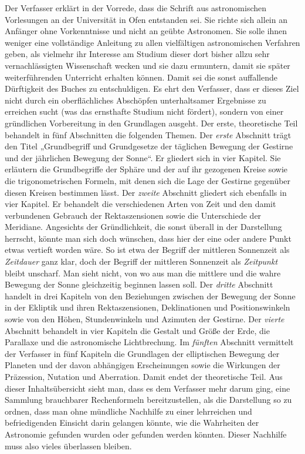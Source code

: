 Der Verfasser erklärt in der Vorrede, dass die Schrift aus astronomischen Vorlesungen an der Universität in Ofen entstanden sei. Sie richte sich allein an Anfänger ohne Vorkenntnisse und nicht an geübte Astronomen. Sie solle ihnen weniger eine vollständige Anleitung zu allen vielfältigen astronomischen Verfahren geben, als vielmehr ihr Interesse am Studium dieser dort bisher allzu sehr vernachlässigten Wissenschaft wecken und sie dazu ermuntern, damit sie später weiterführenden Unterricht erhalten können. Damit sei die sonst auffallende Dürftigkeit des Buches zu entschuldigen. Es ehrt den Verfasser, dass er dieses Ziel nicht durch ein oberflächliches Abschöpfen unterhaltsamer Ergebnisse zu erreichen sucht (was das ernsthafte Studium nicht fördert), sondern von einer gründlichen Vorbereitung in den Grundlagen ausgeht. Der erste, theoretische Teil behandelt in fünf Abschnitten die folgenden Themen. Der \emph{erste} Abschnitt trägt den Titel „Grundbegriff und Grundgesetze der täglichen Bewegung der Gestirne und der jährlichen Bewegung der Sonne“. Er gliedert sich in vier Kapitel. Sie erläutern die Grundbegriffe der Sphäre und der auf ihr gezogenen Kreise sowie die trigonometrischen Formeln, mit denen sich die Lage der Gestirne gegenüber diesen Kreisen bestimmen lässt. Der \emph{zweite} Abschnitt gliedert sich ebenfalls in vier Kapitel. Er behandelt die verschiedenen Arten von Zeit und den damit verbundenen Gebrauch der Rektaszensionen sowie die Unterschiede der Meridiane. Angesichts der Gründlichkeit, die sonst überall in der Darstellung herrscht, könnte man sich doch wünschen, dass hier der eine oder andere Punkt etwas vertieft worden wäre. So ist etwa der Begriff der mittleren Sonnenzeit als \emph{Zeitdauer} ganz klar, doch der Begriff der mittleren Sonnenzeit als \emph{Zeitpunkt} bleibt unscharf. Man sieht nicht, von wo aus man die mittlere und die wahre Bewegung der Sonne gleichzeitig beginnen lassen soll. Der \emph{dritte} Abschnitt handelt in drei Kapiteln von den Beziehungen zwischen der Bewegung der Sonne in der Ekliptik und ihren Rektaszensionen, Deklinationen und Positionswinkeln sowie von den Höhen, Stundenwinkeln und Azimuten der Gestirne. Der \emph{vierte} Abschnitt behandelt in vier Kapiteln die Gestalt und Größe der Erde, die Parallaxe und die astronomische Lichtbrechung. Im \emph{fünften} Abschnitt vermittelt der Verfasser in fünf Kapiteln die Grundlagen der elliptischen Bewegung der Planeten und der davon abhängigen Erscheinungen sowie die Wirkungen der Präzession, Nutation und Aberration. Damit endet der theoretische Teil. Aus dieser Inhaltsübersicht sieht man, dass es dem Verfasser mehr darum ging, eine Sammlung brauchbarer Rechenformeln bereitzustellen, als die Darstellung so zu ordnen, dass man ohne mündliche Nachhilfe zu einer lehrreichen und befriedigenden Einsicht darin gelangen könnte, wie die Wahrheiten der Astronomie gefunden wurden oder gefunden werden könnten. Dieser Nachhilfe muss also vieles überlassen bleiben.

